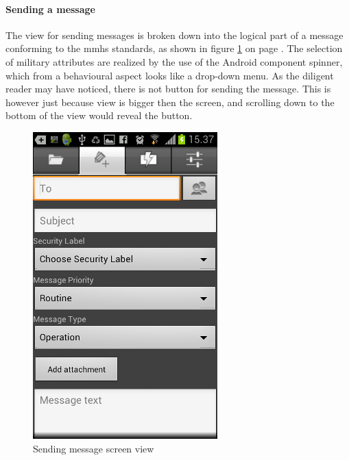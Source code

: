 \paragraph{Sending a message}\hfill 
\newline
The view for sending messages is broken down into the logical part of a message conforming to the \gls{mmhs} standards, as shown in figure \ref{fig:frontend_messagesend} on page \pageref{fig:frontend_messagesend}.
The selection of military attributes are realized by the use of the Android component spinner, which from a behavioural aspect looks like a drop-down menu.
As the diligent reader may have noticed, there is not button for sending the message. This is however just because view is bigger then the screen, and scrolling down to the bottom of the view would reveal the button. 

\begin{figure}[h!]
\begin{center}
\includegraphics{sendmessage_final}
\end{center}
\caption{Sending message screen view} \label{fig:frontend_messagesend}
\end{figure}

